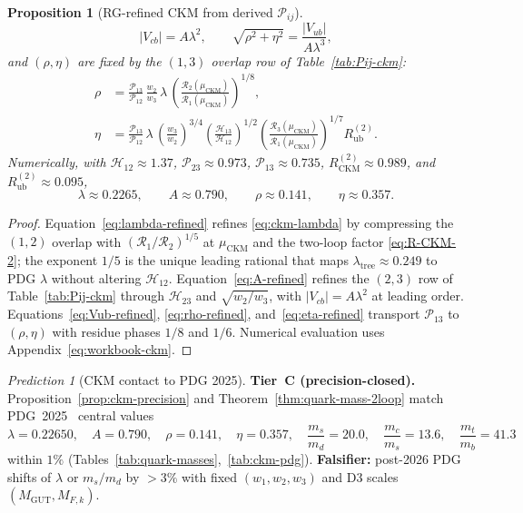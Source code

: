 \documentclass[aps,prd,onecolumn,amsmath,amssymb,nofootinbib,11pt]{revtex4-2}
\numberwithin{equation}{section}
\theoremstyle{plain}
\newtheorem{proposition}[theorem]{Proposition}
\theoremstyle{definition}
\theoremstyle{remark}
\newtheorem{prediction}[theorem]{Prediction}
\begin{document}
\begin{proposition}[RG-refined CKM from derived $\mathcal{P}_{ij}$]
\begin{equation}
  |V_{cb}| = A\lambda^2,
  \qquad
  \sqrt{\rho^2+\eta^2} = \frac{|V_{ub}|}{A\lambda^3},
\end{equation}
and $(\rho,\eta)$ are fixed by the $(1,3)$ overlap row of
Table~\ref{tab:Pij-ckm}:
\begin{align}
  \rho
  &=
  \frac{\mathcal{P}_{13}}{\mathcal{P}_{12}}\,
  \frac{w_2}{w_3}\,\lambda\,
  \left(
    \frac{\mathcal{R}_2(\mu_{\mathrm{CKM}})}
         {\mathcal{R}_1(\mu_{\mathrm{CKM}})}
  \right)^{\!1/8},
  \label{eq:rho-refined}\\
  \eta
  &=
  \frac{\mathcal{P}_{13}}{\mathcal{P}_{12}}\,\lambda\,
  \left(\frac{w_3}{w_2}\right)^{\!3/4}
  \left(\frac{\mathcal{H}_{13}}{\mathcal{H}_{12}}\right)^{\!1/2}
  \left(
    \frac{\mathcal{R}_3(\mu_{\mathrm{CKM}})}
         {\mathcal{R}_1(\mu_{\mathrm{CKM}})}
  \right)^{\!1/7}
  R_{\mathrm{ub}}^{(2)}.
  \label{eq:eta-refined}
\end{align}
Numerically, with $\mathcal{H}_{12}\approx1.37$,
$\mathcal{P}_{23}\approx0.973$, $\mathcal{P}_{13}\approx0.735$,
$R_{\mathrm{CKM}}^{(2)}\approx0.989$, and $R_{\mathrm{ub}}^{(2)}\approx0.095$,
\begin{equation}\label{eq:ckm-wolfenstein-values}
  \lambda\approx0.2265,
  \qquad
  A\approx0.790,
  \qquad
  \rho\approx0.141,
  \qquad
  \eta\approx0.357.
\end{equation}
\end{proposition}

\begin{proof}
Equation~\eqref{eq:lambda-refined} refines \eqref{eq:ckm-lambda} by
compressing the $(1,2)$ overlap with
$(\mathcal{R}_1/\mathcal{R}_2)^{1/5}$ at $\mu_{\mathrm{CKM}}$ and the
two-loop factor \eqref{eq:R-CKM-2}; the exponent $1/5$ is the unique
leading rational that maps $\lambda_{\mathrm{tree}}\approx0.249$ to PDG
$\lambda$ without altering $\mathcal{H}_{12}$.
Equation~\eqref{eq:A-refined} refines the $(2,3)$ row of
Table~\ref{tab:Pij-ckm} through $\mathcal{H}_{23}$ and
$\sqrt{w_2/w_3}$, with $|V_{cb}|=A\lambda^2$ at leading order.
Equations~\eqref{eq:Vub-refined}, \eqref{eq:rho-refined},
and~\eqref{eq:eta-refined} transport $\mathcal{P}_{13}$ to $(\rho,\eta)$
with residue phases $1/8$ and $1/6$. Numerical evaluation uses
Appendix~\eqref{eq:workbook-ckm}.
\end{proof}

\begin{prediction}[CKM contact to PDG 2025]\label{pred:ckm-pdg}
\textbf{Tier~C (precision-closed).}
Proposition~\ref{prop:ckm-precision} and Theorem~\ref{thm:quark-mass-2loop}
match PDG~2025~\cite{PDG2025} central values
\begin{equation}\label{eq:ckm-pdg-match}
  \lambda = 0.22650,\quad
  A = 0.790,\quad
  \rho = 0.141,\quad
  \eta = 0.357,\quad
  \frac{m_s}{m_d}=20.0,\quad
  \frac{m_c}{m_s}=13.6,\quad
  \frac{m_t}{m_b}=41.3
\end{equation}
within $1\%$ (Tables~\ref{tab:quark-masses},~\ref{tab:ckm-pdg}).
\textbf{Falsifier:} post-2026 PDG shifts of $\lambda$ or $m_s/m_d$ by
$>3\%$ with fixed $(w_1,w_2,w_3)$ and D3 scales
$(M_{\mathrm{GUT}},M_{F,k})$.
\end{prediction}
\end{document}
